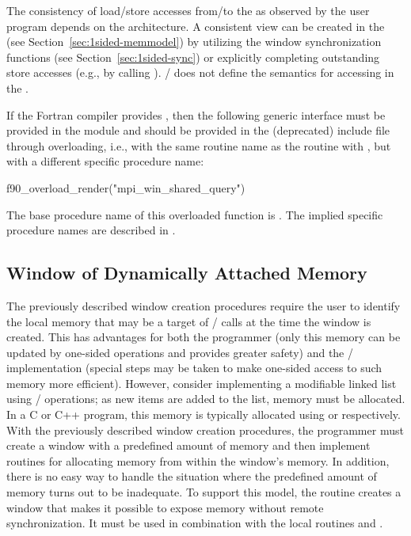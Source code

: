 The consistency of load/store accesses from/to the  as
observed by the user program depends on the architecture. A consistent
view can be created in the  (see 
Section~\ref{sec:1sided-memmodel}) by utilizing the window
synchronization functions (see Section~\ref{sec:1sided-sync}) or
explicitly completing outstanding store accesses (e.g., by calling
). \MPI/ does not define the semantics for accessing
 in the .



If the Fortran compiler provides , 
then the following generic interface must be provided in the 
module and should be provided in the (deprecated)  include file through overloading, 
i.e., with the same routine name as the
routine with  , 
but with a different specific procedure name:
 
\begin{mpi-binding}
    f90_overload_render("mpi_win_shared_query")
\end{mpi-binding}
 
The base procedure name of this overloaded function is
\flushline{}. The implied specific
procedure names
are described in .

\subsection{Window of Dynamically Attached Memory}
\label{sec:rma-create-dynamic}

The previously described window creation procedures require the user to identify the local memory
that may be a target of \RMA/ calls at the time the window is created.  
This has advantages for both the
programmer (only this memory can be updated by one-sided operations
and provides greater safety) and the \MPI/ implementation (special steps may
be taken to make one-sided access to such memory more efficient).
However, consider implementing a modifiable linked list using \RMA/
operations; as new items are added to the list, memory must be
allocated.
In a C or C++ program,
this memory is typically allocated using  or
 respectively.  With the previously described window creation procedures, the programmer must create
a window with a predefined amount of memory and then
implement routines for allocating memory from within the window's
memory.  In addition, there is no easy way to handle the situation
where the predefined amount of memory turns out to be inadequate.
To support this model, the routine 
creates a window that makes it possible to expose memory
without remote synchronization. It must be used in combination with the local
routines  and .

